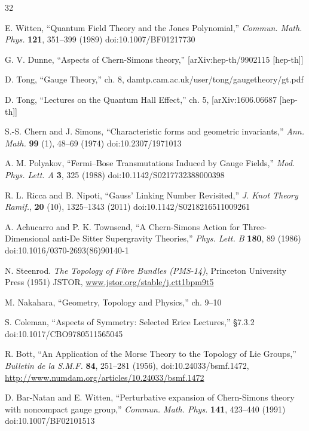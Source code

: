 \begin{thebibliography}{32}

 E. Witten, ``Quantum Field Theory and the Jones Polynomial,'' \emph{Commun. Math. Phys.} \textbf{121}, 351--399 (1989) doi:10.1007/BF01217730

 G. V. Dunne, ``Aspects of Chern-Simons theory,'' [arXiv:hep-th/9902115 [hep-th]]

 D. Tong, ``Gauge Theory,'' ch. 8, damtp.cam.ac.uk/user/tong/gaugetheory/gt.pdf

 D. Tong, ``Lectures on the Quantum Hall Effect,'' ch. 5, [arXiv:1606.06687 [hep-th]]

 S.-S. Chern and J. Simons, ``Characteristic forms and geometric invariants,'' \emph{Ann. Math.} \textbf{99} (1), 48--69 (1974) doi:10.2307/1971013

 A. M. Polyakov, ``Fermi--Bose Transmutations Induced by Gauge Fields,'' \emph{Mod. Phys. Lett. A} \textbf{3}, 325 (1988) doi:10.1142/S0217732388000398

 R. L. Ricca and B. Nipoti, ``Gauss' Linking Number Revisited,'' \emph{J. Knot Theory Ramif.}, \textbf{20} (10), 1325--1343 (2011) doi:10.1142/S0218216511009261

 A. Achucarro and P. K. Townsend, ``A Chern-Simons Action for Three-Dimensional anti-De Sitter Supergravity Theories,'' \emph{Phys. Lett. B} \textbf{180}, 89 (1986) doi:10.1016/0370-2693(86)90140-1

 N. Steenrod. \emph{The Topology of Fibre Bundles (PMS-14)}, Princeton University Press (1951) JSTOR, \href{https://www.jstor.org/stable/j.ctt1bpm9t5}{www.jstor.org/stable/j.ctt1bpm9t5}

 M. Nakahara, ``Geometry, Topology and Physics,'' ch. 9--10

 S. Coleman, ``Aspects of Symmetry: Selected Erice Lectures,'' \S7.3.2 doi:10.1017/CBO9780511565045

 R. Bott, ``An Application of the Morse Theory to the Topology of Lie Groups,'' \emph{Bulletin de la S.M.F.} \textbf{84}, 251--281 (1956), doi:10.24033/bsmf.1472, \href{http://www.numdam.org/articles/10.24033/bsmf.1472}{http://www.numdam.org/articles/10.24033/bsmf.1472}

 D. Bar-Natan and E. Witten, ``Perturbative expansion of Chern-Simons theory with noncompact gauge group,'' \emph{Commun. Math. Phys.} \textbf{141}, 423--440 (1991) doi:10.1007/BF02101513


\end{thebibliography}
